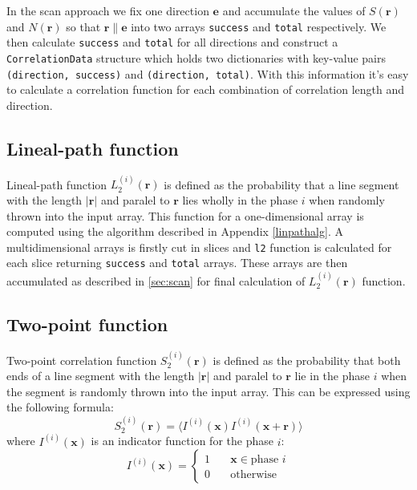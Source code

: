 \documentclass[reprint,amsmath,amssymb,aps,pre,showkeys,showpacs,nofootinbib]{revtex4-1}
\newcommand{\code}[1]{\colorbox{light-gray}{\texttt{#1}}}
\newcommand{\apref}[1]{Appendix \ref{#1}}
\begin{document}
In the scan approach we fix one direction $\bm{e}$ and accumulate the values of
$S(\bm{r})$ and $N(\bm{r})$ so that $\bm{r} \parallel \bm{e}$ into two arrays
\code{success} and \code{total} respectively. We then calculate \code{success}
and \code{total} for all directions and construct a \code{CorrelationData}
structure which holds two dictionaries with key-value pairs
\code{(direction, success)} and \code{(direction, total)}. With this information
it's easy to calculate a correlation function for each combination of
correlation length and direction.

\subsection{Lineal-path function}
Lineal-path function $L_2^{(i)}(\bm{r})$ is defined as the probability that a
line segment with the length $|\bm{r}|$ and paralel to $\bm{r}$ lies wholly in
the phase $i$ when randomly thrown into the input array. This function for a
one-dimensional array is computed using the algorithm described in
\apref{linpathalg}. A multidimensional arrays is firstly cut in slices and
\code{l2} function is calculated for each slice returning \code{success} and
\code{total} arrays. These arrays are then accumulated as described in
\cref{sec:scan} for final calculation of $L_2^{(i)}(\bm{r})$ function.

\subsection{Two-point function}
\label{sec:s2}
Two-point correlation function $S_2^{(i)}(\bm{r})$ is defined as the probability
that both ends of a line segment with the length $|\bm{r}|$ and paralel to
$\bm{r}$ lie in the phase $i$ when the segment is randomly thrown into the input
array. This can be expressed using the following formula:
\begin{equation*}
  S_2^{(i)}(\bm{r}) = \langle I^{(i)}(\bm{x}) I^{(i)}(\bm{x} + \bm{r}) \rangle
\end{equation*}
where $I^{(i)}(\bm{x})$ is an indicator function for the phase $i$:
\begin{equation*}
I^{(i)}(\bm{x}) = \left\{
\begin{array}{ll}
  1 & \quad \bm{x} \in \text{phase $i$} \\
  0 & \quad \text{otherwise}
\end{array}
\right.
\end{equation*}
\end{document}
